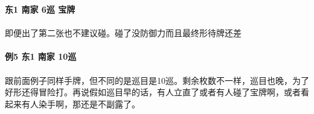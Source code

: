 \documentclass[小V的日麻笔记.tex]{subfiles}
\begin{document}
\textbf{东1 南家 6巡 宝牌}
\\
\\
即便出了第二张也不建议碰。碰了没防御力而且最终形待牌还差
\\
\hrulefill
\\
\textbf{例5 东1 南家 10巡 }
\\
\\
跟前面例子同样手牌，但不同的是巡目是10巡。剩余枚数不一样，巡目也晚，为了好形还得冒险打。再说假如巡目早的话，有人立直了或者有人碰了宝牌啊，或者看起来有人染手啊，那还是不副露了。
\end{document}
